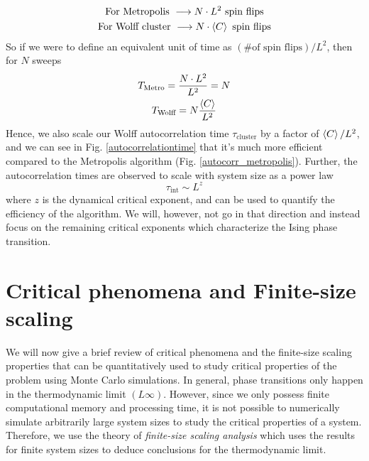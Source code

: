 \documentclass[../journal_main.tex]{subfiles}
\begin{document}
\begin{gather*}
    \text{For Metropolis } \longrightarrow N \cdot L^2 \text{ spin flips} \\
    \text{For Wolff cluster } \longrightarrow N \cdot \expval{C} \text{ spin flips}
\end{gather*}
So if we were to define an equivalent unit of time as $(\text{\# of spin flips})/L^2$, then for $N$ sweeps
\begin{gather*}
    T_\text{Metro} = \frac{N \cdot L^2}{L^2} = N \\
    T_\text{Wolff} = N \frac{\expval{C}}{L^2}
\end{gather*}     
Hence, we also scale our Wolff autocorrelation time $\tau_\text{cluster}$ by a factor of $\expval{C}/L^2$, and we can see in Fig. \ref{autocorrelationtime} that it's much more efficient compared to the Metropolis algorithm (Fig. \ref{autocorr_metropolis}). Further, the autocorrelation times are observed to scale with system size as a power law 
\[
    \tau_\text{int} \sim L^z
\]
where $z$ is the dynamical critical exponent, and can be used to quantify the efficiency of the algorithm. We will, however, not go in that direction and instead focus on the remaining critical exponents which characterize the Ising phase transition. 

\section{Critical phenomena and Finite-size scaling}
We will now give a brief review of critical phenomena and the finite-size scaling properties that can be quantitatively used to study critical properties of the problem using Monte Carlo simulations. In general, phase transitions only happen in the thermodynamic limit $(L  \infty)$. However, since we only possess finite computational memory and processing time, it is not possible to numerically simulate arbitrarily large system sizes to study the critical properties of a system. Therefore, we use the theory of \textit{finite-size scaling analysis} which uses the results for finite system sizes to deduce conclusions for the thermodynamic limit. 
\end{document}
